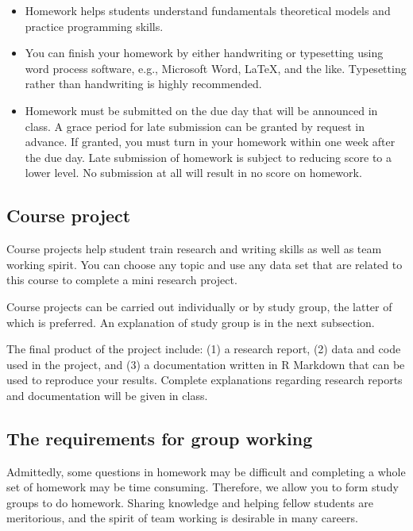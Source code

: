 \documentclass[11pt]{article}
\begin{document}
\begin{itemize}
\item Homework helps students understand fundamentals
theoretical models and practice programming skills.

\item You can finish your homework by either handwriting or typesetting
using word process software, e.g., Microsoft Word, \LaTeX{}, and the
like. Typesetting rather than handwriting is highly recommended.

\item Homework must be submitted on the due day that will be announced in
class. A grace period for late submission can be granted by request
in advance. If granted, you must turn in your homework within one
week after the due day. Late submission of homework is subject to
reducing score to a lower level. No submission at all will result in
no score on homework.
\end{itemize}


\subsection*{Course project}
\label{sec:orgaf5f801}

Course projects help student train research and writing skills as well
as team working spirit. You can choose any topic and use any data set
that are related to this course to complete a mini research
project.

Course projects can be carried out individually or by study group, the
latter of which is preferred. An explanation of study group is in the
next subsection.

The final product of the project include: (1) a research report, (2)
data and code used in the project, and (3) a documentation written in
R Markdown that can be used to reproduce your results. Complete
explanations regarding research reports and documentation will be
given in class.

\subsection*{The requirements for group working}
\label{sec:org93f2ff1}

Admittedly, some questions in homework may be difficult and completing
a whole set of homework may be time consuming. Therefore, we allow you
to form study groups to do homework. Sharing knowledge and helping
fellow students are meritorious, and the spirit of team working is
desirable in many careers.
\end{document}
